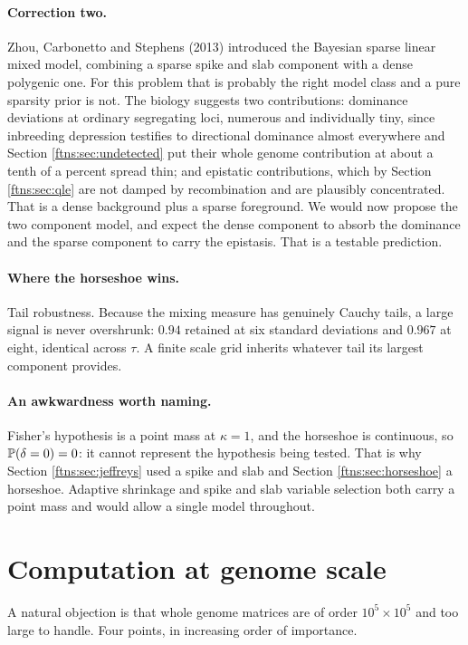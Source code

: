 \paragraph{Correction two.} Zhou, Carbonetto and Stephens (2013) introduced the Bayesian sparse
linear mixed model, combining a sparse spike and slab component with a dense polygenic one. For
this problem that is probably the right model class and a pure sparsity prior is not. The biology
suggests two contributions: dominance deviations at ordinary segregating loci, numerous and
individually tiny, since inbreeding depression testifies to directional dominance almost everywhere
and Section \ref{ftns:sec:undetected} put their whole genome contribution at about a tenth of a percent
spread thin; and epistatic contributions, which by Section \ref{ftns:sec:qle} are not damped by
recombination and are plausibly concentrated. That is a dense background plus a sparse foreground.
We would now propose the two component model, and expect the dense component to absorb the
dominance and the sparse component to carry the epistasis. That is a testable prediction.

\paragraph{Where the horseshoe wins.} Tail robustness. Because the mixing measure has genuinely
Cauchy tails, a large signal is never overshrunk: $0.94$ retained at six standard deviations and
$0.967$ at eight, identical across $\tau$. A finite scale grid inherits whatever tail its largest
component provides.

\paragraph{An awkwardness worth naming.} Fisher's hypothesis is a point mass at $\kappa=1$, and the
horseshoe is continuous, so $\mathbb{P}(\delta=0)=0$: it cannot represent the hypothesis being tested.
That is why Section \ref{ftns:sec:jeffreys} used a spike and slab and Section \ref{ftns:sec:horseshoe} a
horseshoe. Adaptive shrinkage and spike and slab variable selection both carry a point mass and
would allow a single model throughout.

\section{Computation at genome scale}
\label{ftns:sec:compute}

A natural objection is that whole genome matrices are of order $10^5\times10^5$ and too large to
handle. Four points, in increasing order of importance.

